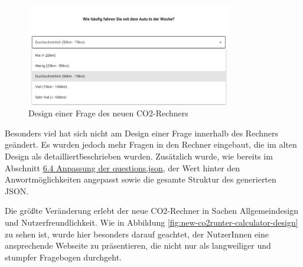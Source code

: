 \begin{figure}[H]
    \centering
    \includegraphics[width=0.8\textwidth]{images/06/Question_New_Design.png}
    \caption{Design einer Frage des neuen CO2-Rechners}
    \label{fig:new-co2runter-question-design}
\end{figure}

Besonders viel hat sich nicht am Design einer Frage innerhalb des Rechners geändert.
Es wurden jedoch mehr Fragen in den Rechner eingebaut, die im alten Design als \"detailliert\" beschrieben wurden. Zusätzlich wurde, wie bereits im Abschnitt \hyperref[sec:anpassung-der-questions-json]{6.4 Anpassung der questions.json}, der Wert hinter den Anwortmöglichkeiten angepasst sowie die gesamte Struktur des generierten \acs{JSON}.

Die größte Veränderung erlebt der neue CO2-Rechner in Sachen Allgemeindesign und Nutzerfreundlichkeit. Wie in Abbildung \ref{fig:new-co2runter-calculator-design} zu sehen ist, wurde hier besonders darauf geachtet, der NutzerInnen eine ansprechende Webseite zu präsentieren, die nicht nur als langweiliger und stumpfer Fragebogen durchgeht.

